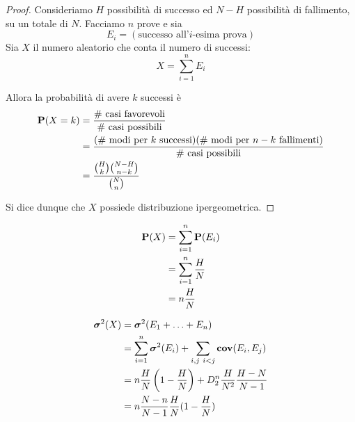 \begin{proof}
  Consideriamo \( H \) possibilità di successo ed \( N - H \) possibilità di fallimento, su un totale di \( N \).
  Facciamo \( n \) prove e sia
  \[ E_i = (\text{successo all'}i\text{-esima prova}) \]
  Sia \( X \) il numero aleatorio che conta il numero di successi:
  \[ X = \sum_{i = 1}^n E_i \]

  Allora la probabilità di avere \( k \) successi è
  \begin{align*}
    \mathbf{P}(X = k) &= \frac{\text{\# casi favorevoli}}{\text{\# casi possibili}} \\
    &= \frac{(\text{\# modi per }k\text{ successi})(\text{\# modi per }n - k\text{ fallimenti})}{\text{\# casi possibili}} \\
    &= \frac{\binom{H}{k} \binom{N-H}{n-k}}{\binom{N}{n}}
  \end{align*}

  Si dice dunque che \( X \) possiede distribuzione ipergeometrica.
\end{proof}

\begin{proposition}
  \begin{align*}
    \mathbf{P}(X) &= \sum_{i=1}^n \mathbf{P}(E_i) \\
    &= \sum_{i=1}^n \frac{H}{N} \\
    &= n \frac{H}{N}
  \end{align*}
\end{proposition}

\begin{proposition}
  \begin{align*} %
    \var(X) &= \var(E_1 + \ldots + E_n) \\
    &= \sum_{i = 1}^n \var(E_i) + \sum_{i,j ~ i < j} \cov(E_i, E_j) \\ %
    &= n \frac{H}{N} \left( 1 - \frac{H}{N} \right) + D_2^n \frac{H}{N^2} \frac{H - N}{N - 1} \\
    &= n \frac{N - n}{N - 1} \frac{H}{N} (1 - \frac{H}{N})
  \end{align*}
\end{proposition}

